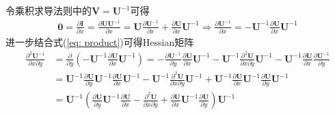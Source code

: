 \documentclass{ctexart}
\theoremstyle{definition}
\def \zerov {\bm{0}}
\def \Iv {\mathbf{I}}
\def \Uv {\mathbf{U}}
\def \Vv {\mathbf{V}}
\begin{document}
令乘积求导法则中的$\Vv = \Uv^{-1}$可得
\begin{align} \label{eq: inverse}
    \zerov = \frac{\partial \Iv}{\partial x} = \frac{\partial \Uv \Uv^{-1}}{\partial x} = \Uv \frac{\partial \Uv^{-1}}{\partial x} + \frac{\partial \Uv}{\partial x} \Uv^{-1} \Longrightarrow \frac{\partial \Uv^{-1}}{\partial x} = - \Uv^{-1} \frac{\partial \Uv}{\partial x} \Uv^{-1}
\end{align}
进一步结合式(\ref{eq: product})可得Hessian矩阵
\begin{align*}
    \frac{\partial^2 \Uv^{-1}}{\partial x \partial y} & = \frac{\partial}{\partial y} \left( - \Uv^{-1} \frac{\partial \Uv}{\partial x} \Uv^{-1} \right) = - \frac{\partial \Uv^{-1}}{\partial y} \frac{\partial \Uv}{\partial x} \Uv^{-1} - \Uv^{-1} \frac{\partial^2 \Uv}{\partial x \partial y} \Uv^{-1} - \Uv^{-1} \frac{\partial \Uv}{\partial x} \frac{\partial \Uv^{-1}}{\partial y} \\
                                                      & = \Uv^{-1} \frac{\partial \Uv}{\partial y} \Uv^{-1} \frac{\partial \Uv}{\partial x} \Uv^{-1} - \Uv^{-1} \frac{\partial^2 \Uv}{\partial x \partial y} \Uv^{-1} + \Uv^{-1} \frac{\partial \Uv}{\partial x} \Uv^{-1} \frac{\partial \Uv}{\partial y} \Uv^{-1}                                                                          \\
                                                      & = \Uv^{-1} \left( \frac{\partial \Uv}{\partial y} \Uv^{-1} \frac{\partial \Uv}{\partial x} - \frac{\partial^2 \Uv}{\partial x \partial y} + \frac{\partial \Uv}{\partial x} \Uv^{-1} \frac{\partial \Uv}{\partial y} \right) \Uv^{-1}
\end{align*}
\end{document}
